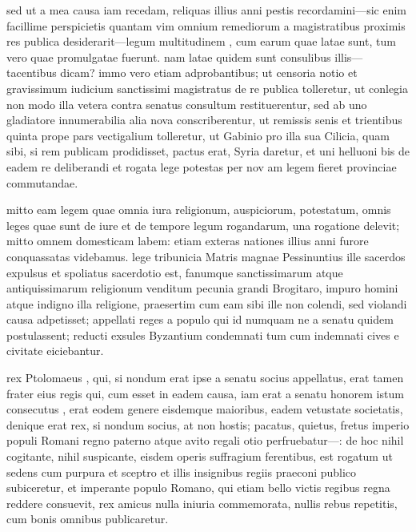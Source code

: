  sed ut a mea causa iam recedam, reliquas illius anni pestis recordamini—sic enim facillime perspicietis quantam vim omnium remediorum a magistratibus proximis res publica desiderarit—legum multitudinem , cum earum quae latae sunt, tum vero quae promulgatae fuerunt. nam latae quidem sunt consulibus illis—tacentibus dicam? immo vero etiam adprobantibus; ut censoria notio et gravissimum iudicium sanctissimi magistratus de re publica tolleretur, ut conlegia non modo illa vetera contra senatus consultum restituerentur, sed ab uno gladiatore innumerabilia alia nova conscriberentur, ut remissis senis et trientibus quinta prope pars vectigalium tolleretur, ut Gabinio pro illa sua Cilicia, quam sibi, si rem publicam prodidisset, pactus erat, Syria daretur, et uni helluoni bis de eadem re deliberandi et rogata lege potestas per nov am legem fieret provinciae commutandae.

 mitto eam legem quae omnia iura religionum, auspiciorum, potestatum, omnis leges quae sunt de iure et de tempore legum rogandarum, una rogatione delevit; mitto omnem domesticam labem: etiam exteras nationes illius anni furore conquassatas videbamus. lege tribunicia Matris magnae Pessinuntius ille sacerdos expulsus et spoliatus sacerdotio est, fanumque sanctissimarum atque antiquissimarum religionum venditum pecunia grandi Brogitaro, impuro homini atque indigno illa religione, praesertim cum eam sibi ille non colendi, sed violandi causa adpetisset; appellati reges a populo qui id numquam ne a senatu quidem postulassent; reducti exsules Byzantium condemnati tum cum indemnati cives e civitate eiciebantur.

 rex Ptolomaeus , qui, si nondum erat ipse a senatu socius appellatus, erat tamen frater eius regis qui, cum esset in eadem causa, iam erat a senatu honorem istum consecutus , erat eodem genere eisdemque maioribus, eadem vetustate societatis, denique erat rex, si nondum socius, at non hostis; pacatus, quietus, fretus imperio populi Romani regno paterno atque avito regali otio perfruebatur—: de hoc nihil cogitante, nihil suspicante, eisdem operis suffragium ferentibus, est rogatum ut sedens cum purpura et sceptro et illis insignibus regiis praeconi publico subiceretur, et imperante populo Romano, qui etiam bello victis regibus regna reddere consuevit, rex amicus nulla iniuria commemorata, nullis rebus repetitis, cum bonis omnibus publicaretur.


